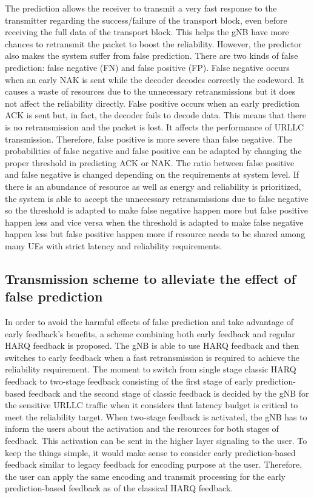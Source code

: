 \documentclass[conference]{IEEEtran}
\begin{document}
The prediction allows the receiver to transmit a very fast response to the transmitter regarding the success/failure of the transport block, even before receiving the full data of the transport block. This helps the gNB have more chances to retransmit the packet to boost the reliability. However, the predictor also makes the system suffer from false prediction. There are two kinds of false prediction: false negative (FN) and false positive (FP). False negative occurs when an early NAK is sent while the decoder decodes correctly the codeword. It causes a waste of resources due to the unnecessary retransmissions but it does not affect the reliability directly. False positive occurs when an early prediction ACK is sent but, in fact, the decoder fails to decode data. This means that there is no retransmission and the packet is lost. It affects the performance of URLLC transmission. Therefore, false positive is more severe than false negative. The probabilities of false negative and false positive can be adapted by changing the proper threshold in predicting ACK or NAK. The ratio between false positive and false negative is changed depending on the requirements at system level.  If there is an abundance of resource as well as energy and reliability is prioritized, the system is able to accept
the unnecessary retransmissions due to false negative so the threshold is adapted to make false negative happen more but false positive happen less and vice versa when the threshold is
adapted to make false negative happen less but false positive happen more if resource needs to be shared among many UEs with strict latency and reliability requirements.

\subsection{Transmission scheme to alleviate the effect of false prediction}\label{CC}

In order to avoid the harmful effects of false prediction and take advantage of early feedback's benefits, a scheme combining both early feedback and regular HARQ feedback is proposed. The gNB is able to use HARQ feedback and then switches to early feedback when a fast retransmission is required to achieve the reliability requirement. The moment to switch from single stage classic HARQ feedback to two-stage feedback consisting of the first stage of early prediction-based feedback and the second stage of classic feedback is decided by the gNB for the sensitive URLLC traffic when it considers that latency budget is critical to meet the reliability target. When two-stage feedback is activated, the gNB has to inform the users about the activation and the resources for both stages of feedback. This activation can be sent in the higher layer signaling to the user. To keep the things simple, it would make sense to consider early prediction-based feedback similar to legacy feedback for encoding purpose at the user. Therefore, the user can apply the same encoding and transmit processing for the early prediction-based feedback as of the classical HARQ feedback.
\end{document}
